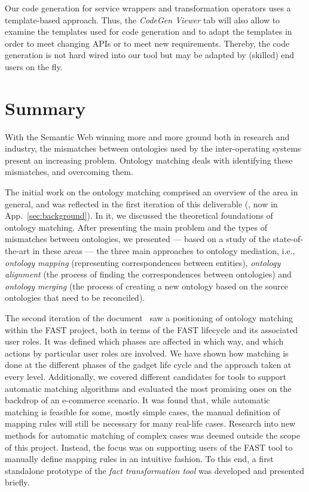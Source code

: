 Our code generation for service wrappers and transformation operators uses a template-based approach. Thus, the \textit{CodeGen Viewer} tab will also allow to examine the templates used for code generation and to adapt the templates in order to meet changing APIs or to meet new requirements. Thereby, the code generation is not hard wired into our tool but may be adapted by (skilled) end users on the fly. 

\section{Summary}
\label{sec:summary}
With the Semantic Web winning more and more ground both in research and industry, the mismatches between ontologies used by the inter-operating systems present an increasing problem. Ontology matching deals with identifying these mismatches, and overcoming them. 

The initial work on the ontology matching comprised an overview of the area in general, and was reflected in the first iteration of this deliverable (\cite{ambrus2009mediation}, now in App.~\ref{sec:background}). In it, we discussed the theoretical foundations of ontology matching. After presenting the main problem and the types of mismatches between ontologies, we presented --- based on a study of the state-of-the-art in these areas --- the three main approaches to ontology mediation, i.e., \textit{ontology mapping} (representing  correspondences between entities), \textit{ontology alignment} (the process of finding the correspondences between ontologies) and \textit{ontology merging} (the process of creating a new ontology based on the source ontologies that need to be reconciled). 

The second iteration of the document~\cite{ambrus2010mediation} saw a positioning of ontology matching within the FAST project, both in terms of the FAST lifecycle and its associated user roles. It was defined which phases are affected in which way, and which actions by particular user roles are involved. We have shown how matching is done at the different phases of the gadget life cycle and the approach taken at every level. Additionally, we covered different candidates for tools to support automatic matching algorithms and evaluated the most promising ones on the backdrop of an e-commerce scenario. It was found that, while automatic matching is feasible for some, mostly simple cases, the manual definition of mapping rules will still be necessary for many real-life cases. Research into new methods for automatic matching of complex cases was deemed outside the scope of this project. Instead, the focus was on supporting users of the FAST tool to manually define mapping rules in an intuitive fashion. To this end, a first standalone prototype of the \emph{fact transformation tool} was developed and presented briefly.

